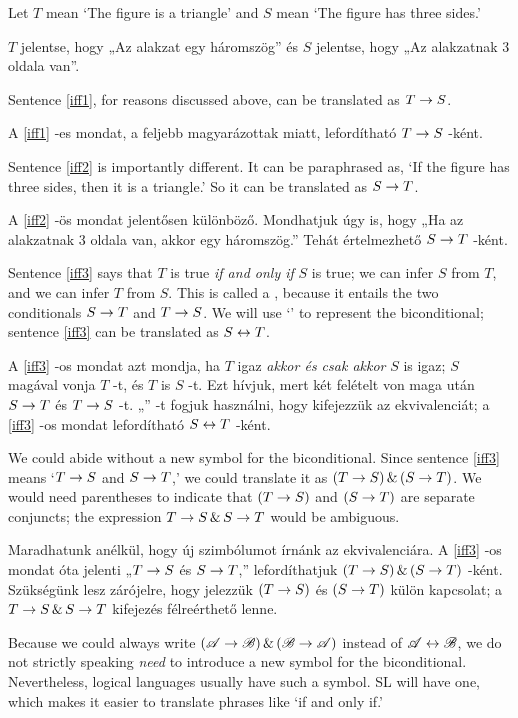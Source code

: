 Let $T$ mean `The figure is a triangle' and $S$ mean `The figure has three sides.'

$T$ jelentse, hogy „Az alakzat egy háromszög” és $S$ jelentse, hogy „Az alakzatnak 3 oldala van”.

Sentence \ref{iff1}, for reasons discussed above, can be translated as $T\rightarrow S$.

A \ref{iff1} -es mondat, a feljebb magyarázottak miatt, lefordítható $T\rightarrow S$ -ként.

Sentence \ref{iff2} is importantly different. It can be paraphrased as, `If the figure has three sides, then it is a triangle.' So it can be translated as $S\rightarrow T$.

A \ref{iff2} -ös mondat jelentősen különböző. Mondhatjuk úgy is, hogy „Ha az alakzatnak 3 oldala van, akkor egy háromszög.” Tehát értelmezhető $S\rightarrow T$ -ként.

Sentence \ref{iff3} says that $T$ is true \emph{if and only if} $S$ is true; we can infer $S$ from $T$, and we can infer $T$ from $S$. This is called a , because it entails the two conditionals $S\rightarrow T$ and $T \rightarrow S$. We will use `\eiff' to represent the biconditional; sentence \ref{iff3} can be translated as $S \leftrightarrow T$.

A \ref{iff3} -os mondat azt mondja, ha $T$ igaz \emph{akkor és csak akkor} $S$ is igaz; $S$ magával vonja $T$ -t, és $T$ is $S$ -t. Ezt  hívjuk, mert két felételt von maga után $S\rightarrow T$ és $T \rightarrow S$ -t. „\eiff” -t fogjuk használni, hogy kifejezzük az ekvivalenciát; a \ref{iff3} -os mondat lefordítható $S \leftrightarrow T$ -ként.

We could abide without a new symbol for the biconditional. Since sentence \ref{iff3} means `$T \rightarrow S$ and $S\rightarrow T$,' we could translate it as $(T \rightarrow S)\,\&\,(S\rightarrow T)$. We would need parentheses to indicate that $(T \rightarrow S)$ and $(S\rightarrow T)$ are separate conjuncts; the expression $T \rightarrow S\,\&\, S\rightarrow T$ would be ambiguous.

Maradhatunk anélkül, hogy új szimbólumot írnánk az ekvivalenciára. A \ref{iff3} -os mondat óta jelenti „$T \rightarrow S$ és $S\rightarrow T$,” lefordíthatjuk $(T \rightarrow S)\,\&\,(S\rightarrow T)$ -ként. Szükségünk lesz zárójelre, hogy jelezzük $(T \rightarrow S)$ és $(S\rightarrow T)$ külön kapcsolat; a $T \rightarrow S\,\&\, S\rightarrow T$ kifejezés félreérthető lenne.

Because we could always write $(\mathscr{A}\rightarrow\mathscr{B})\,\&\,(\mathscr{B}\rightarrow\mathscr{A})$ instead of $\mathscr{A}\leftrightarrow\mathscr{B}$, we do not strictly speaking \emph{need} to introduce a new symbol for the biconditional. Nevertheless, logical languages usually have such a symbol. SL will have one, which makes it easier to translate phrases like `if and only if.'

